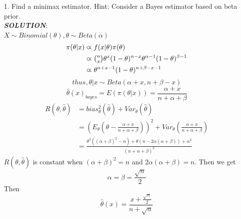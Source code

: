 \documentclass{article}
\theoremstyle{definition}
\theoremstyle{definition}
\theoremstyle{remark}
\begin{document}
1. Find a minimax estimator. Hint: Consider a Bayes estimator based on beta prior.\\
\emph{\textbf{SOLUTION}}:\\
$X\sim Binomial(\theta), \theta\sim Beta(\alpha)$
\begin{equation}\nonumber
\begin{aligned}
\pi(\theta|x) &\varpropto f(x|\theta)\pi(\theta)\\
              &\varpropto \tbinom{n}{x}\theta^x(1-\theta)^{n-x}\theta^{\alpha-1}(1-\theta)^{\beta-1}\\
              &\varpropto \theta^{\alpha+x-1}(1-\theta)^{n+\beta-x-1}
\end{aligned}
\end{equation}
\[thus, \theta|x \sim Beta(\alpha+x, n+\beta-x)\]
\[\hat{\theta}(x)_{bayes}=E(\pi(\theta|x))=\frac{\alpha+x}{n+\alpha+\beta}\]
\begin{equation}\nonumber
\begin{aligned}
R(\theta,\hat{\theta})&= bias_\theta^2(\hat{\theta})+Var_\theta(\hat{\theta})\\
              &=(E_\theta(\theta-\frac{\alpha+x}{n+\alpha+\beta}))^2 + Var_\theta(\frac{\alpha+x}{n+\alpha+\beta})\\
              &= \frac{\theta^2((\alpha+\beta)^2-n)+\theta(n-2\alpha(\alpha+\beta))+\alpha^2}{(n+\alpha+\beta)^2}
\end{aligned}
\end{equation}
$R(\theta,\hat{\theta}) $ is constant when $(\alpha+\beta)^2 = n$ and $2\alpha(\alpha+\beta)=n$. Then we get
\[\alpha=\beta=\frac{\sqrt{n}}{2}\]
Then
\[\hat{\theta}(x)=\frac{x+\frac{\sqrt{n}}{2}}{n+\sqrt{n}}\]
\end{document}
